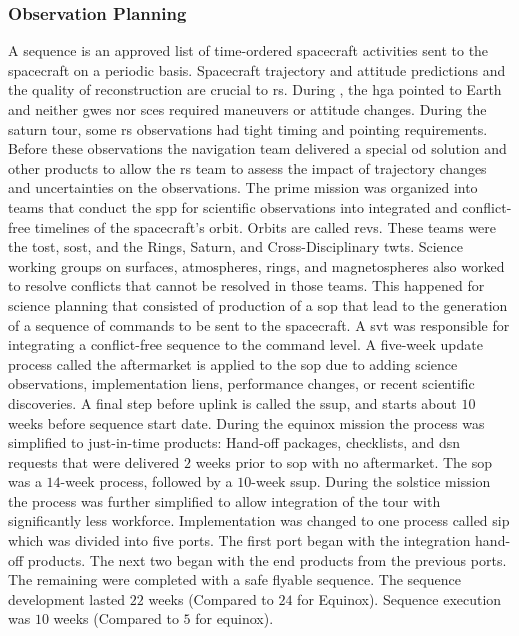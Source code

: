 \documentclass[oneside]{book}
\theoremstyle{mystyle}
\begin{document}
\subsubsection{\footnotesize Observation Planning \label{subsubsec:usr_obs_planning}}

A \gls{sequence} is an approved list of time-ordered spacecraft activities sent to the spacecraft on a periodic basis. Spacecraft \gls{trajectory} and \gls{attitude} predictions and the quality of reconstruction are crucial to \gls{rs}. During , the \gls{hga} pointed to Earth and neither \glspl{gwe} nor \glspl{sce} required maneuvers or \gls{attitude} changes. During the \gls{saturn tour}, some \gls{rs} observations had tight timing and pointing requirements. Before these observations the navigation team delivered a special \gls{od} solution and other products to allow the \gls{rs} team to assess the impact of trajectory changes and uncertainties on the observations. The \gls{prime mission} was organized into teams that conduct the \gls{spp} for scientific observations into integrated and conflict-free timelines of the spacecraft's orbit. Orbits are called \glspl{rev}. These teams were the \gls{tost}, \gls{sost}, and the Rings, Saturn, and Cross-Disciplinary \glspl{twt}. Science working groups on surfaces, atmospheres, rings, and \glspl{magnetosphere} also worked to resolve conflicts that cannot be resolved in those teams. This happened for science planning that consisted of production of a \gls{sop} that lead to the generation of a sequence of commands to be sent to the spacecraft. A \gls{svt} was responsible for integrating a conflict-free sequence to the command level. A five-week update process called the aftermarket is applied to the \gls{sop} due to adding science observations, implementation liens, performance changes, or recent scientific discoveries. A final step before \gls{uplink} is called the \gls{ssup}, and starts about $10$ weeks before sequence start date. During the \gls{equinox mission} the process was simplified to just-in-time products: Hand-off packages, checklists, and \gls{dsn} requests that were delivered $2$ weeks prior to \gls{sop} with no aftermarket. The \gls{sop} was a $14$-week process, followed by a $10$-week \gls{ssup}. During the \gls{solstice mission} the process was further simplified to allow integration of the tour with significantly less workforce. Implementation was changed to one process called \gls{sip} which was divided into five ports. The first port began with the integration hand-off products. The next two began with the end products from the previous ports. The remaining were completed with a safe flyable sequence. The sequence development lasted $22$ weeks (Compared to $24$ for Equinox). Sequence execution was $10$ weeks (Compared to $5$ for equinox). 
\end{document}

